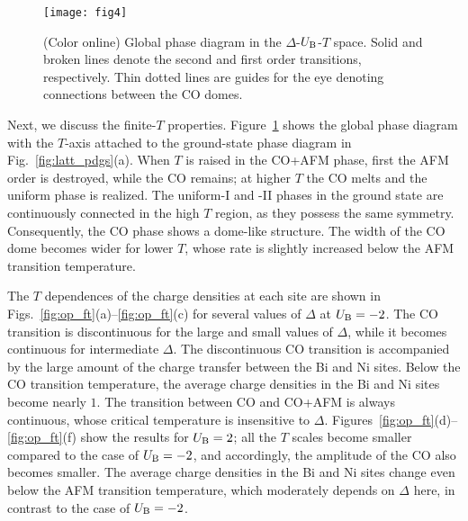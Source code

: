 \documentclass[aps,twocolumn,prl,showpacs,preprintnumbers,amsmath,amssymb]{revtex4}
\begin{document}
\begin{figure}[t]
\begin{center}
\texttt{[image: fig4]}
\end{center}
\caption{(Color online) 
Global phase diagram in the $\Delta$-$U_{\rm B}$-$T$ space. 
Solid and broken lines denote the second and first order transitions, respectively. 
Thin dotted lines are guides for the eye denoting connections between the CO domes. 
}
\label{fig:pd_global}
\end{figure}
%
%
%
Next, we discuss the finite-$T$ properties. 
Figure~\ref{fig:pd_global} shows the global phase diagram with the $T$-axis attached to the ground-state phase diagram in Fig.~\ref{fig:latt_pdgs}(a). 
When $T$ is raised in the CO+AFM phase,  first the AFM order is destroyed, while the CO remains; at higher $T$ the CO melts and the uniform phase is realized. 
The uniform-I and -II phases in the ground state are continuously connected in the high $T$ region, as they possess the same symmetry. 
Consequently, the CO phase shows a dome-like structure. 
The width of the CO dome becomes wider for lower $T$, whose rate is slightly increased below the AFM transition temperature. 

The $T$ dependences of the charge densities at each site are shown in Figs.~\ref{fig:op_ft}(a)--\ref{fig:op_ft}(c) for several values of $\Delta$ at $U_{\rm B} = - 2$. 
The CO transition is discontinuous for the large and small values of $\Delta$, while it becomes continuous for intermediate $\Delta$. 
The discontinuous CO transition is accompanied by the large amount of the charge transfer between the Bi and Ni sites. 
Below the CO transition temperature, the average charge densities in the Bi and Ni sites become nearly $1$. 
The transition between CO and CO+AFM is always continuous, whose critical temperature is insensitive to $\Delta$. 
Figures~\ref{fig:op_ft}(d)--\ref{fig:op_ft}(f) show the results for $U_{\rm B} = 2$; 
all the $T$ scales become smaller compared to the case of $U_{\rm B} = -2$, and accordingly, the amplitude of the CO also becomes smaller. 
The average charge densities in the Bi and Ni sites change even below the AFM transition temperature, which moderately depends on $\Delta$ here, in contrast to the case of $U_{\rm B} = -2$. 
\end{document}
